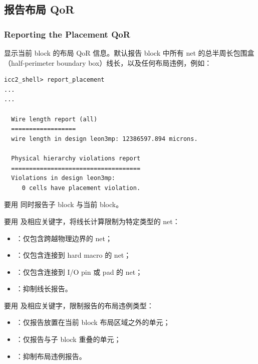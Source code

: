 \subsection{报告布局 QoR}
\subsubsection*{Reporting the Placement QoR}

 显示当前 block 的布局 QoR 信息。默认报告 block 中所有 net 的总半周长包围盒（half-perimeter boundary box）线长，以及任何布局违例，例如：
\begin{lstlisting}
icc2_shell> report_placement
...
...

  Wire length report (all)
  ==================
  wire length in design leon3mp: 12386597.894 microns.

  Physical hierarchy violations report
  ====================================
  Violations in design leon3mp:
     0 cells have placement violation.
\end{lstlisting}

要用  同时报告子 block 与当前 block。

要用  及相应关键字，将线长计算限制为特定类型的 net：
\begin{itemize}
  \item {}：仅包含跨越物理边界的 net；
  \item {}：仅包含连接到 hard macro 的 net；
  \item {}：仅包含连接到 I/O pin 或 pad 的 net；
  \item {}：抑制线长报告。
\end{itemize}

要用  及相应关键字，限制报告的布局违例类型：
\begin{itemize}
  \item {}：仅报告放置在当前 block 布局区域之外的单元；
  \item {}：仅报告与子 block 重叠的单元；
  \item {}：抑制布局违例报告。
\end{itemize}

